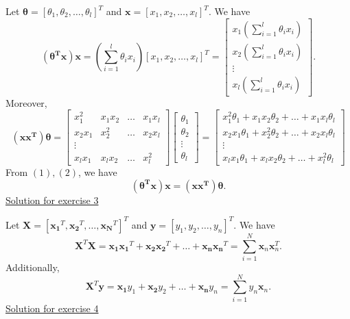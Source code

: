 \documentclass[12pt]{book}
\begin{document}
\noindent
Let $\bm{\theta} = [\theta_1,\theta_2,\dots,\theta_l]^T$ and $\bm{x} = [x_1,x_2,\dots,x_l]^T$. We have
\begin{equation}
\bm{(\theta^Tx)x} = \left( \sum_{i=1}^l\theta_ix_i \right) [x_1,x_2,\dots,x_l]^T =
\begin{bmatrix}
x_{1}\left( \sum_{i=1}^l\theta_ix_i \right) \\
x_{2}\left( \sum_{i=1}^l\theta_ix_i \right) \\
\vdots \\
x_{l}\left( \sum_{i=1}^l\theta_ix_i \right)
\end{bmatrix}.
\end{equation}
Moreover,
\begin{equation}
\bm{(xx^T)\theta} =
\begin{bmatrix}
x_{1}^2 & x_1x_2 & \dots & x_1x_l \\
x_2x_1 & x_2^2 & \dots & x_2x_l \\
\vdots \\
x_{l}x_1 & x_lx_2 & \dots & x_l^2
\end{bmatrix}
\begin{bmatrix}
\theta_1 \\
\theta_2\\
\vdots \\
\theta_l
\end{bmatrix}
 =
  \begin{bmatrix}
  x_1^2\theta_1 + x_1x_2\theta_2 + \dots +x_1x_l\theta_l \\
  x_2x_1\theta_1 + x_2^2\theta_2 + \dots +x_2x_l\theta_l\\
  \vdots \\
  x_lx_1\theta_1 + x_lx_2\theta_2 + \dots +x_l^2\theta_l
  \end{bmatrix}
\end{equation}
From $(1),(2)$, we have
\begin{equation*}
\bm{(\theta^Tx)x} = \bm{(xx^T)\theta}.
\end{equation*} 
\vspace{0.5 cm}
{\underline{\large Solution for exercise 3}}
\vspace{0.3 cm}

\noindent
Let $\bm{X} = [\bm{x_1}^T,\bm{x_2}^T,\dots,\bm{x_N}^T]^T$ and $\bm{y}=[y_1,y_2,\dots,y_n]^T$. We have
\begin{equation*}
\bm{X}^T\bm{X} = \bm{x_1x_1}^T + \bm{x_2x_2}^T + \dots + \bm{x_nx_n}^T = \sum_{i=1}^{N}\bm{x}_n\bm{x}_n^T.
\end{equation*}
Additionally,
\begin{equation*}
\bm{X}^T\bm{y} = \bm{x_1}y_1 + \bm{x_2}y_2 + \dots + \bm{x_n}y_n = \sum_{i=1}^{N}y_n\bm{x}_n.
\end{equation*}
\vspace{0.5 cm}
{\underline{\large Solution for exercise 4}}
\vspace{0.3 cm}
\end{document}
